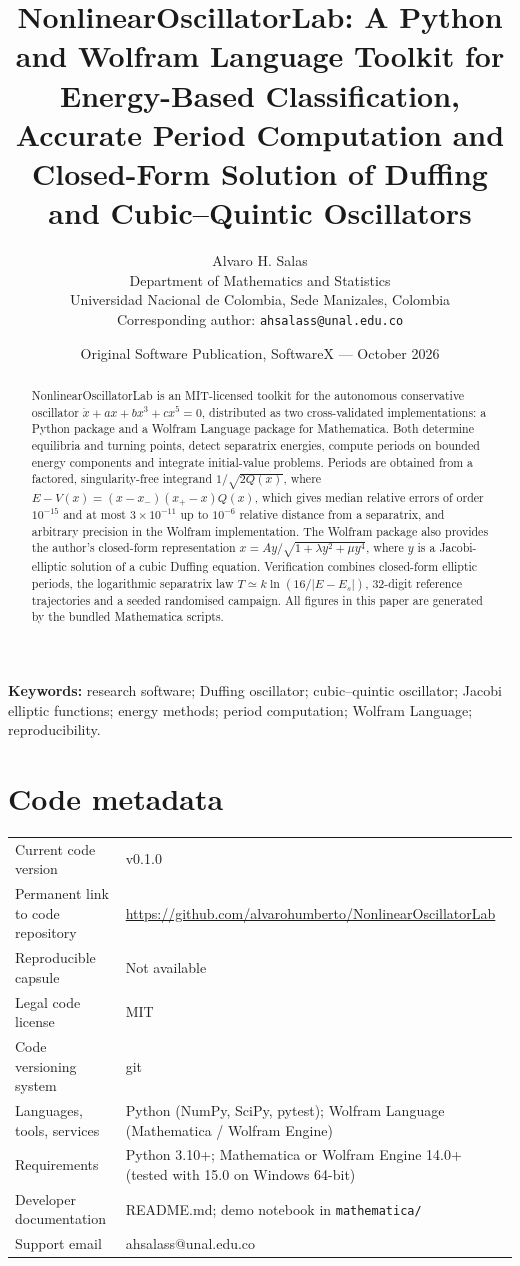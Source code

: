 \documentclass[11pt]{article}
\title{NonlinearOscillatorLab: A Python and Wolfram Language Toolkit for Energy-Based Classification, Accurate Period Computation and Closed-Form Solution of Duffing and Cubic--Quintic Oscillators}
\author{Alvaro H. Salas\\[2pt]\normalsize Department of Mathematics and Statistics\\\normalsize Universidad Nacional de Colombia, Sede Manizales, Colombia\\[2pt]\normalsize Corresponding author: \texttt{ahsalass@unal.edu.co}}
\date{Original Software Publication, SoftwareX --- October 2026}
\begin{document}
\sloppy\maketitle
\begin{abstract}
NonlinearOscillatorLab is an MIT-licensed toolkit for the autonomous conservative oscillator $\ddot x+ax+bx^3+cx^5=0$, distributed as two cross-validated implementations: a Python package and a Wolfram Language package for Mathematica. Both determine equilibria and turning points, detect separatrix energies, compute periods on bounded energy components and integrate initial-value problems. Periods are obtained from a factored, singularity-free integrand $1/\sqrt{2Q(x)}$, where $E-V(x)=(x-x_-)(x_+-x)Q(x)$, which gives median relative errors of order $10^{-15}$ and at most $3\times10^{-11}$ up to $10^{-6}$ relative distance from a separatrix, and arbitrary precision in the Wolfram implementation. The Wolfram package also provides the author's closed-form representation $x=Ay/\sqrt{1+\lambda y^2+\mu y^4}$, where $y$ is a Jacobi-elliptic solution of a cubic Duffing equation. Verification combines closed-form elliptic periods, the logarithmic separatrix law $T\simeq k\ln(16/|E-E_s|)$, 32-digit reference trajectories and a seeded randomised campaign. All figures in this paper are generated by the bundled Mathematica scripts.
\end{abstract}
\noindent\textbf{Keywords:} research software; Duffing oscillator; cubic--quintic oscillator; Jacobi elliptic functions; energy methods; period computation; Wolfram Language; reproducibility.

\section*{Code metadata}
\small
\begin{tabular}{@{}p{}p{}@{}}\toprule
Current code version & v0.1.0\\
Permanent link to code repository & \url{https://github.com/alvarohumberto/NonlinearOscillatorLab}\\
Reproducible capsule & Not available\\
Legal code license & MIT\\
Code versioning system & git\\
Languages, tools, services & Python (NumPy, SciPy, pytest); Wolfram Language (Mathematica / Wolfram Engine)\\
Requirements & Python 3.10+; Mathematica or Wolfram Engine 14.0+ (tested with 15.0 on Windows 64-bit)\\
Developer documentation & README.md; demo notebook in \texttt{mathematica/}\\
Support email & ahsalass@unal.edu.co\\\bottomrule
\end{tabular}
\normalsize
\end{document}
